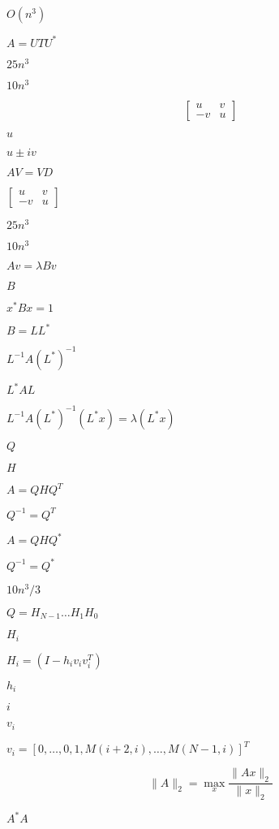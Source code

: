 \documentclass{article}
\begin{document}
$ O(n^3) $
\pagebreak

$ A = U T U^*$
\pagebreak

$25n^3$
\pagebreak

$10n^3$
\pagebreak

\[ \begin{bmatrix} u & v \\ -v & u \end{bmatrix} \]
\pagebreak

$ u $
\pagebreak

$ u \pm iv $
\pagebreak

$ AV = VD $
\pagebreak

$ \begin{bmatrix} u & v \\ -v & u \end{bmatrix} $
\pagebreak

$ 25n^3 $
\pagebreak

$ 10n^3 $
\pagebreak

$ Av = \lambda Bv $
\pagebreak

$ B $
\pagebreak

$ x^* B x = 1 $
\pagebreak

$ B = LL^* $
\pagebreak

$ L^{-1} A (L^*)^{-1} $
\pagebreak

$ L^{*} A L $
\pagebreak

$ L^{-1} A (L^*)^{-1} (L^* x) = \lambda (L^* x) $
\pagebreak

$ Q $
\pagebreak

$ H $
\pagebreak

$ A = Q H Q^T $
\pagebreak

$ Q^{-1} = Q^T $
\pagebreak

$ A = Q H Q^* $
\pagebreak

$ Q^{-1} = Q^* $
\pagebreak

$ 10n^3/3 $
\pagebreak

$ Q = H_{N-1} \ldots H_1 H_0 $
\pagebreak

$ H_i $
\pagebreak

$ H_i = (I - h_i v_i v_i^T) $
\pagebreak

$ h_i $
\pagebreak

$ i $
\pagebreak

$ v_i $
\pagebreak

$ v_i = [ 0, \ldots, 0, 1, M(i+2,i), \ldots, M(N-1,i) ]^T $
\pagebreak

\[ \|A\|_2 = \max_x \frac{\|Ax\|_2}{\|x\|_2} \]
\pagebreak

$ A^*A $
\pagebreak
\end{document}

